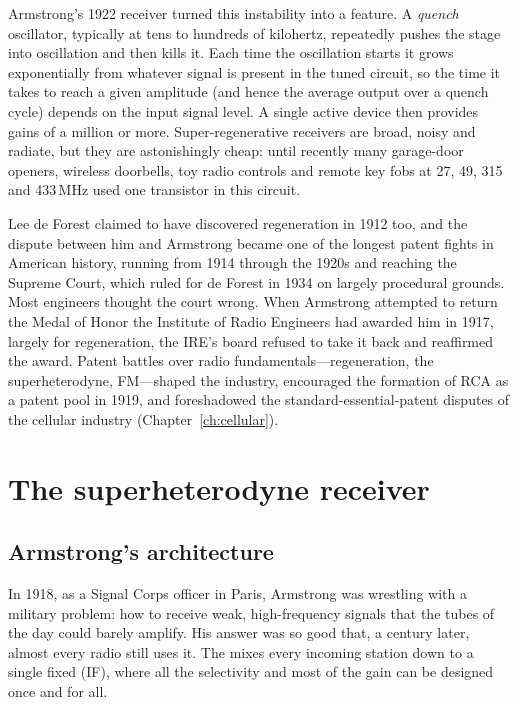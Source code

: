 Armstrong's 1922  receiver turned this instability into a feature. A \emph{quench}
oscillator, typically at tens to hundreds of kilohertz, repeatedly pushes the stage into oscillation and then
kills it. Each time the oscillation starts it grows exponentially from whatever signal is present in the
tuned circuit, so the time it takes to reach a given amplitude (and hence the average output over a quench
cycle) depends on the input signal level. A single active device then provides gains of a million or more.
Super-regenerative receivers are broad, noisy and radiate, but they are astonishingly cheap: until recently
many garage-door openers, wireless doorbells, toy radio controls and remote key fobs at 27, 49, 315 and
433\,MHz used one transistor in this circuit.

\begin{inpractice}[title=Regeneration in court]
Lee de Forest claimed to have discovered regeneration in 1912 too, and the dispute between him and Armstrong
became one of the longest patent fights in American history, running from 1914 through the 1920s and reaching
the Supreme Court, which ruled for de Forest in 1934 on largely procedural grounds. Most engineers thought the
court wrong. When Armstrong attempted to return the Medal of Honor the Institute of Radio Engineers had
awarded him in 1917, largely for regeneration, the IRE's board refused to take it back and reaffirmed the
award. Patent battles over radio fundamentals---regeneration, the superheterodyne, FM---shaped the industry,
encouraged the formation of RCA as a patent pool in 1919, and foreshadowed the standard-essential-patent
disputes of the cellular industry (Chapter~\ref{ch:cellular}).
\end{inpractice}

\section{The superheterodyne receiver}
\label{sec:ch04:superhet}

\subsection{Armstrong's architecture}

In 1918, as a Signal Corps officer in Paris, Armstrong was wrestling with a military problem: how to
receive weak, high-frequency signals that the tubes of the day could barely amplify. His answer was so
good that, a century later, almost every radio still uses it. The  mixes every
incoming station down to a single fixed  (IF), where all the selectivity and
most of the gain can be designed once and for all.

